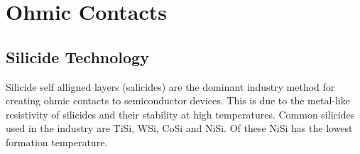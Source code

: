 
\chapter{Ohmic Contacts}

\section{Silicide Technology}

Silicide self alligned layers (salicides) are the dominant industry method for creating ohmic contacts to semiconductor devices. This is due to the metal-like resistivity of silicides and their stability at high temperatures. Common silicides used in the industry are TiSi, WSi, CoSi and NiSi. Of these NiSi has the lowest formation temperature.


\cleardoublepage